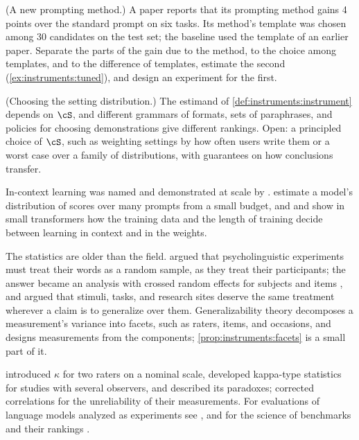 \begin{refsection}
\begin{exercises}
\item \critique (A new prompting method.) A paper reports that its prompting method gains 4 points over the standard prompt on six tasks. Its method's template was chosen among 30 candidates on the test set; the baseline used the template of an earlier paper. Separate the parts of the gain due to the method, to the choice among templates, and to the difference of templates, estimate the second (\cref{ex:instruments:tuned}), and design an experiment for the first.\label{ex:instruments:critique2}

\item \research (Choosing the setting distribution.) The estimand of \cref{def:instruments:instrument} depends on $\cS$, and different grammars of formats, sets of paraphrases, and policies for choosing demonstrations give different rankings. Open: a principled choice of $\cS$, such as weighting settings by how often users write them or a worst case over a family of distributions, with guarantees on how conclusions transfer.\label{ex:instruments:research}
\end{exercises}

\notesandrefs
In-context learning was named and demonstrated at scale by \textcite{BrownEtAl2020}. \Textcite{PoloEtAl2024} estimate a model's distribution of scores over many prompts from a small budget, and \textcite{ChanEtAl2022} and \textcite{SinghEtAl2023} show in small transformers how the training data and the length of training decide between learning in context and in the weights.

The statistics are older than the field. \Textcite{Clark1973} argued that psycholinguistic experiments must treat their words as a random sample, as they treat their participants; the answer became an analysis with crossed random effects for subjects and items \parencite{BaayenDavidsonBates2008}, and \textcite{Yarkoni2022} argued that stimuli, tasks, and research sites deserve the same treatment wherever a claim is to generalize over them. Generalizability theory \parencite{CronbachEtAl1972} decomposes a measurement's variance into facets, such as raters, items, and occasions, and designs measurements from the components; \cref{prop:instruments:facets} is a small part of it.

\Textcite{Cohen1960} introduced $\kappa$ for two raters on a nominal scale, \textcite{LandisKoch1977} developed kappa-type statistics for studies with several observers, and \textcite{FeinsteinCicchetti1990} described its paradoxes; \textcite{Spearman1904} corrected correlations for the unreliability of their measurements. For evaluations of language models analyzed as experiments see \textcite{Miller2024}, and for the science of benchmarks and their rankings \textcite{Hardt2026}.


\end{refsection}
